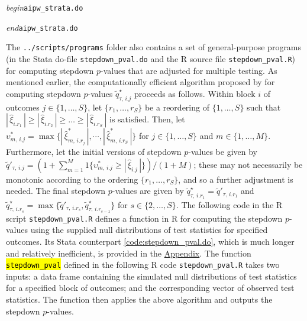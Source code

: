 \documentclass[12pt]{article}
\newcommand{\hlc}[2][yellow]{{%
    \colorlet{foo}{#1}%
    \sethlcolor{foo}\hl{#2}}%
}
\newcommand{\ctext}[1]{\hlc[teal!20]{\texttt{#1}}}
\begin{document}
\noindent \textit{begin}\quad \texttt{aipw\_strata.do}

\vspace{-3mm}
\noindent \textit{end}\quad \texttt{aipw\_strata.do}

\vspace{5mm}

The \texttt{../scripts/programs} folder also contains a set of general-purpose programs (in the Stata do-file \texttt{stepdown\_pval.do} and the R source file \texttt{stepdown\_pval.R}) for computing stepdown $p$-values that are adjusted for multiple testing. As mentioned earlier, the computationally efficient algorithm proposed by \cite{romano2005exact, romano2016efficient} for computing stepdown $p$-values $\tilde{q}^\star_{\tau,\,i.j}$ proceeds as follows. Within block $i$ of outcomes $j \in \{1, \dots, S\}$, let $\{r_1,\dots,r_S\}$ be a reordering of $\{1, \dots, S\}$ such that $|\,\widehat{\xi}_{i.r_1}\,| \geq |\,\widehat{\xi}_{i.r_2}\,| \geq  \dots \geq |\,\widehat{\xi}_{i.r_S}\,|$ is satisfied. Then, let $\upsilon^*_{m,\,i.j} = \max\{|\,\widehat{\xi}^*_{m,\,i.r_j}\,|,\cdots,|\,\widehat{\xi}^*_{m,\,i.r_S}\,|\}$ for $j \in \{1,\dots,S\}$ and $m \in \{1,\dots,M\}$. Furthermore, let the initial versions of stepdown $p$-values be given by $\tilde{q}'_{\tau,\,i.j} = (1 + \sum_{m = 1}^M 1\{\upsilon^*_{m,\,i.j} \geq |\,\widehat{\xi}_{i.j}\,|\})/(1 + M)$; these may not necessarily be monotonic according to the ordering $\{r_1,\dots,r_S\}$, and so a further adjustment is needed. The final stepdown $p$-values are given by $\tilde{q}^\star_{\tau,\,i.r_1} = \tilde{q}'_{\tau,\,i.r_1}$ and $\tilde{q}^\star_{\tau,\,i.r_s} = \max\{\tilde{q}'_{\tau,\,i.r_s}, \tilde{q}^\star_{\tau,\,i.r_{s - 1}}\}$ for $s\in \{2,\dots,S\}$. The following code in the R script \texttt{stepdown\_pval.R} defines a function in R for computing the stepdown $p$-values using the supplied null distributions of test statistics for specified outcomes. Its Stata counterpart \ref{code:stepdown_pval.do}, which is much longer and relatively inefficient, is provided in the \hyperref[sec:appendix]{Appendix}. The function \ctext{stepdown\_pval} defined in the following R code \texttt{stepdown\_pval.R} takes two inputs: a data frame containing the simulated null distributions of test statistics for a specified block of outcomes; and the corresponding vector of observed test statistics. The function then applies the above algorithm and outputs the stepdown $p$-values.

\vspace{5mm}
\end{document}
